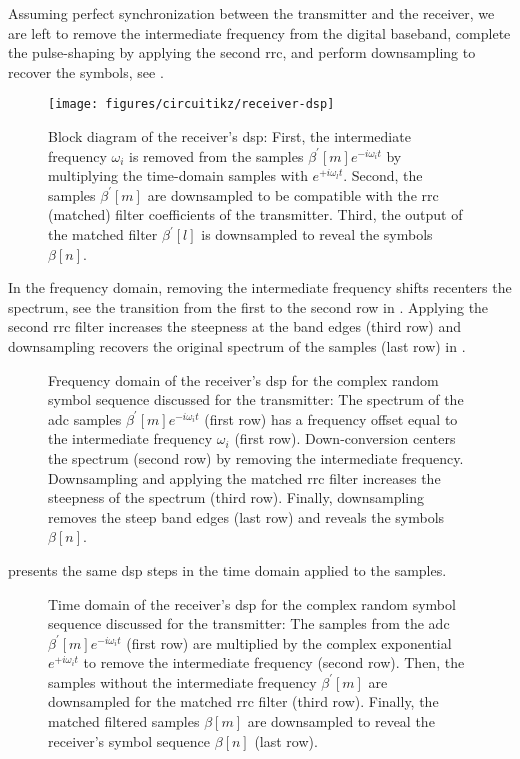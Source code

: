 Assuming perfect synchronization between the transmitter and the receiver, we are left to remove the intermediate frequency from the digital baseband, complete the pulse-shaping by applying the second \gls{rrc}, and perform downsampling to recover the symbols, see .
\begin{figure}[htb]
	\centering
	\texttt{[image: figures/circuitikz/receiver-dsp]}
	\caption{Block diagram of the receiver's \gls{dsp}: First, the intermediate frequency $\omega_i$ is removed from the samples $\beta^\prime[m]e^{-i\omega_it}$ by multiplying the time-domain samples with $e^{+i\omega_lt}$. Second, the samples $\beta^\prime[m]$ are downsampled to be compatible with the \gls{rrc} (matched) filter coefficients of the transmitter. Third, the output of the matched filter $\beta^\prime[l]$ is downsampled to reveal the symbols $\beta[n]$.}\label{fig:receiver_dsp}
\end{figure}
In the frequency domain, removing the intermediate frequency shifts recenters the spectrum, see the transition from the first to the second row in .
Applying the second \gls{rrc} filter increases the steepness at the band edges (third row) and downsampling recovers the original spectrum of the samples (last row) in .
\begin{figure}[htb]
	\centering
	
	\caption{Frequency domain of the receiver's \gls{dsp} for the complex random symbol sequence discussed for the transmitter: The spectrum of the \gls{adc} samples $\beta^\prime[m]e^{-i\omega_it}$ (first row) has a frequency offset equal to the intermediate frequency $\omega_i$ (first row). Down-conversion centers the spectrum (second row) by removing the intermediate frequency. Downsampling and applying the matched \gls{rrc} filter increases the steepness of the spectrum (third row). Finally, downsampling removes the steep band edges (last row) and reveals the symbols $\beta[n]$.}\label{fig:receiver_frequency}
\end{figure}
 presents the same \gls{dsp} steps in the time domain applied to the samples.
\begin{figure}[htb]
	\centering
	
	\caption{Time domain of the receiver's \gls{dsp} for the complex random symbol sequence discussed for the transmitter: The samples from the \gls{adc} $\beta^\prime[m]e^{-i\omega_it}$ (first row) are multiplied by the complex exponential $e^{+i\omega_it}$ to remove the intermediate frequency (second row). Then, the samples without the intermediate frequency $\beta^\prime[m]$ are downsampled for the matched \gls{rrc} filter (third row). Finally, the matched filtered samples $\beta[m]$ are downsampled to reveal the receiver's symbol sequence $\beta[n]$ (last row).}\label{fig:receiver_time}
\end{figure}

\FloatBarrier
